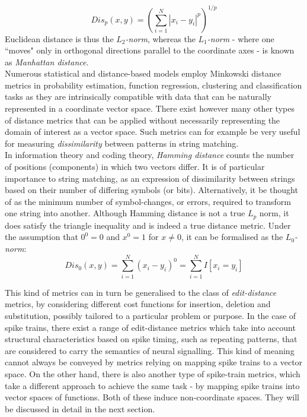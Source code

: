 \documentclass[12pt]{extarticle}
\begin{document}
\begin{equation} 
Dis_p (x,y) = \left(\sum_{i=1}^{N} |x_i - y_i|^p\right)^{1/p}
\end{equation}
Euclidean distance is thus the $L_2$\textit{-norm}, whereas the
$L_1$\textit{-norm} - where one ``moves" only in orthogonal directions
parallel to the coordinate axes - is known as \textit{Manhattan distance}.\\

\noindent Numerous statistical and distance-based models employ
Minkowski distance metrics in probability estimation, function
regression, clustering and classification tasks as they are
intrinsically compatible with data that can be naturally represented
in a coordinate vector space. There exist however many other types of distance metrics
that can be applied without necessarily representing the domain of
interest as a vector space. Such metrics can for example be very
useful for measuring \textit{dissimilarity} between patterns in string
matching.\\

\noindent In information theory and coding theory, \textit{Hamming
  distance} counts the number of positions (components) in which two
vectors differ. It is of particular importance to string matching, as
an expression of dissimilarity between strings based on their number
of differing symbols (or bits). Alternatively, it be thought of as the
minimum number of symbol-changes, or errors, required to transform one
string into another. Although Hamming distance is not a true $L_p$
norm, it does satisfy the triangle inequality and is indeed a true
distance metric. Under the assumption that $0^0=0$ and $x^0=1$ for
$x\neq0$, it can be formalised as the $L_0$\textit{-norm}:
\begin{equation}
Dis_0(x,y)=\sum_{i=1}^{N}(x_i-y_i)^0=\sum_{i=1}^{N} I[x_i=y_i]
\end{equation}

\noindent This kind of metrics can in turn be generalised to the class
of \textit{edit-distance} metrics, by considering different cost
functions for insertion, deletion and substitution, possibly tailored
to a particular problem or purpose. In the case of spike trains, 
there exist a range of
edit-distance metrics which take into account structural
characteristics based on spike timing, such as repeating patterns,
that are considered to carry the semantics of neural signalling. This
kind of meaning cannot always be conveyed by metrics relying on
mapping spike trains to a vector space. On the other hand, there is
also another type of spike-train metrics, which take a different
approach to achieve the same task - by mapping spike trains into
vector spaces of functions. Both of these induce non-coordinate
spaces. They will be discussed in detail in the next section.\\
\end{document}
